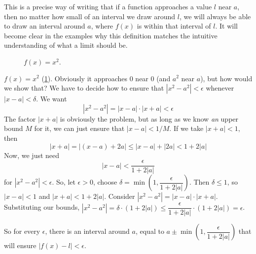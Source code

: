 \documentclass[10pt]{book}
\newcommand{\newthought}[1]{\vspace{0.5\baselineskip}\noindent{\scshape #1}}
\begin{document}
This is a precise way of writing that if a function approaches a value $l$ near $a$, then no matter how small
of an interval we
draw around $l$, we will always
be able to draw an interval around $a$, where $f(x)$ is within that interval of $l$. It will become clear in
the examples why
this definition matches the intuitive
understanding of what a limit should be.

\begin{figure}
  \centering
  \caption{$f(x)=x^2$.}
  \label{fig:x2}
\end{figure}
\newthought{Consider} $f(x)=x^2$ (\cref{fig:x2}). Obviously it approaches 0 near 0 (and $a^2$ near $a$), but
how would we show that?
We have to decide how to ensure that $|x^2-a^2| < \epsilon$ whenever $|x-a| < \delta$. We want
\[|x^2-a^2| = |x-a| \cdot |x+a| < \epsilon\]
The factor $|x+a|$ is obviously the problem, but as long as we know \emph{an} upper bound $M$ for it, we can
just ensure that $|x-a|<1/M$.
If we take $|x+a|<1$, then
\[|x+a| = |(x-a)+2a| \le |x-a| + |2a| < 1 + 2|a|\]
Now, we just need
\[|x-a| < \dfrac{\epsilon}{1+2|a|}\]
for $|x^2-a^2| < \epsilon$. So, let $\epsilon > 0$, choose $\delta =
\min\left(1,\dfrac{\epsilon}{1+2|a|}\right)$. Then $\delta \le 1$,
so $|x-a|<1$ and $|x+a|<1+2|a|$. Consider $|x^2-a^2| = |x-a| \cdot |x+a|$. Substituting our bounds,
$|x^2-a^2| = \delta \cdot (1+2|a|) \le \dfrac{\epsilon}{1+2|a|} \cdot (1+2|a|) = \epsilon$.

So for every $\epsilon$, there is an interval around $a$, equal to $a \pm
\min\left(1,\dfrac{\epsilon}{1+2|a|}\right)$ that will
ensure $|f(x)-l| < \epsilon$.
\end{document}

